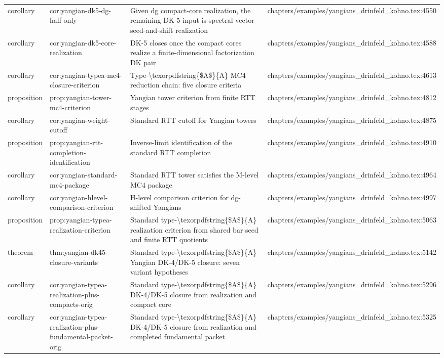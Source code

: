 \documentclass[11pt]{article}
\begin{document}
\begin{longtable}{L{0.10\textwidth}L{0.26\textwidth}L{0.42\textwidth}L{0.22\textwidth}}
corollary & cor:yangian-dk5-dg-half-only & Given dg compact-core realization, the remaining DK-5 input is spectral vector seed-and-shift realization & chapters/examples/yangians\_drinfeld\_kohno.tex:4550\\
corollary & cor:yangian-dk5-core-realization & DK-5 closes once the compact cores realize a finite-dimensional factorization DK pair & chapters/examples/yangians\_drinfeld\_kohno.tex:4588\\
corollary & cor:yangian-typea-mc4-closure-criterion & Type-\textbackslash{}texorpdfstring\{\$A\$\}\{A\} MC4 reduction chain: five closure criteria & chapters/examples/yangians\_drinfeld\_kohno.tex:4613\\
proposition & prop:yangian-tower-mc4-criterion & Yangian tower criterion from finite RTT stages & chapters/examples/yangians\_drinfeld\_kohno.tex:4812\\
corollary & cor:yangian-weight-cutoff & Standard RTT cutoff for Yangian towers & chapters/examples/yangians\_drinfeld\_kohno.tex:4875\\
proposition & prop:yangian-rtt-completion-identification & Inverse-limit identification of the standard RTT completion & chapters/examples/yangians\_drinfeld\_kohno.tex:4910\\
corollary & cor:yangian-standard-mc4-package & Standard RTT tower satisfies the M-level MC4 package & chapters/examples/yangians\_drinfeld\_kohno.tex:4964\\
corollary & cor:yangian-hlevel-comparison-criterion & H-level comparison criterion for dg-shifted Yangians & chapters/examples/yangians\_drinfeld\_kohno.tex:4997\\
proposition & prop:yangian-typea-realization-criterion & Standard type-\textbackslash{}texorpdfstring\{\$A\$\}\{A\} realization criterion from shared bar seed and finite RTT quotients & chapters/examples/yangians\_drinfeld\_kohno.tex:5063\\
theorem & thm:yangian-dk45-closure-variants & Standard type-\textbackslash{}texorpdfstring\{\$A\$\}\{A\} Yangian DK-4/DK-5 closure: seven variant hypotheses & chapters/examples/yangians\_drinfeld\_kohno.tex:5142\\
corollary & cor:yangian-typea-realization-plus-compacts-orig & Standard type-\textbackslash{}texorpdfstring\{\$A\$\}\{A\} DK-4/DK-5 closure from realization and compact core & chapters/examples/yangians\_drinfeld\_kohno.tex:5296\\
corollary & cor:yangian-typea-realization-plus-fundamental-packet-orig & Standard type-\textbackslash{}texorpdfstring\{\$A\$\}\{A\} DK-4/DK-5 closure from realization and completed fundamental packet & chapters/examples/yangians\_drinfeld\_kohno.tex:5325\\

\end{longtable}
\end{document}
